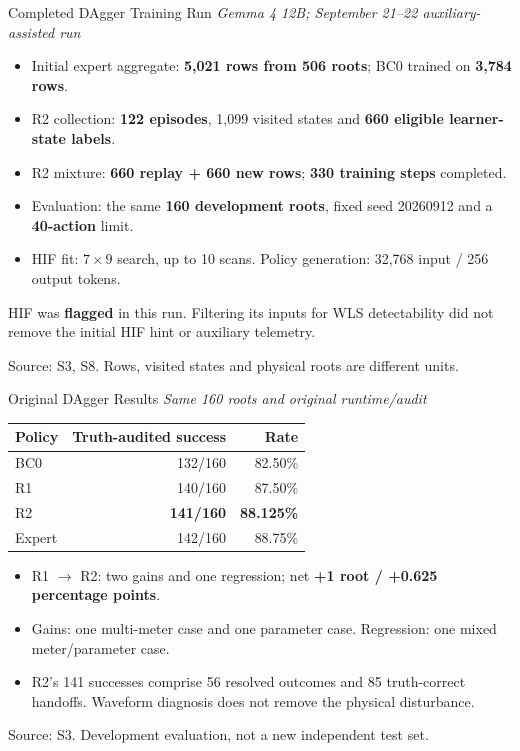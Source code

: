 \documentclass{beamer}
\newcommand{\src}[1]{\par\vfill\begin{minipage}{0.67\textwidth}\tiny\color{gray}Source: #1.\end{minipage}\par}
\newcommand{\scope}[1]{{\small\textit{#1}}\par\vspace{0.5em}}
\begin{document}
\begin{frame}{Completed DAgger Training Run}
  \scope{Gemma 4 12B; September 21--22 auxiliary-assisted run}
  \begin{itemize}
    \setlength\itemsep{0.55em}
    \item Initial expert aggregate: \textbf{5,021 rows from 506 roots}; BC0 trained on \textbf{3,784 rows}.
    \item R2 collection: \textbf{122 episodes}, 1,099 visited states and \textbf{660 eligible learner-state labels}.
    \item R2 mixture: \textbf{660 replay + 660 new rows}; \textbf{330 training steps} completed.
    \item Evaluation: the same \textbf{160 development roots}, fixed seed 20260912 and a \textbf{40-action} limit.
    \item HIF fit: $7\times9$ search, up to 10 scans. Policy generation: 32,768 input / 256 output tokens.
  \end{itemize}
  \small HIF was \textbf{flagged} in this run. Filtering its inputs for WLS detectability did not remove the initial HIF hint or auxiliary telemetry.
  \src{S3, S8. Rows, visited states and physical roots are different units}
\end{frame}

\begin{frame}{Original DAgger Results}
  \scope{Same 160 roots and original runtime/audit}
  \begin{center}
    \renewcommand{\arraystretch}{1.25}
    \begin{tabular}{lrr}
      \toprule
      Policy & Truth-audited success & Rate \\
      \midrule
      BC0 & 132/160 & 82.50\% \\
      R1 & 140/160 & 87.50\% \\
      R2 & \textbf{141/160} & \textbf{88.125\%} \\
      Expert & 142/160 & 88.75\% \\
      \bottomrule
    \end{tabular}
  \end{center}
  \begin{itemize}
    \item R1 $\rightarrow$ R2: two gains and one regression; net \textbf{+1 root / +0.625 percentage points}.
    \item Gains: one multi-meter case and one parameter case. Regression: one mixed meter/parameter case.
    \item R2's 141 successes comprise 56 resolved outcomes and 85 truth-correct handoffs. Waveform diagnosis does not remove the physical disturbance.
  \end{itemize}
  \src{S3. Development evaluation, not a new independent test set}
\end{frame}
\end{document}
